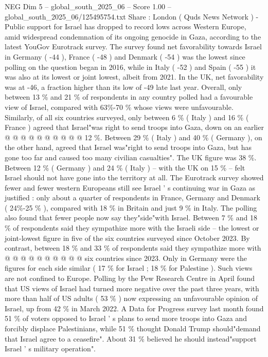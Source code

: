 \begin{textsample}{NEG Dim 5 – global\_south\_2025\_06 – Score 1.00 – global\_south\_2025\_06/125495754.txt}  \label{ex:f5_neg_400}
Share : London ( Quds News Network ) - Public support for Israel has dropped to record lows across Western Europe, amid widespread condemnation of its ongoing genocide in Gaza, according to the latest YouGov Eurotrack survey.
The survey found net favorability towards Israel in Germany ( -44 ), France ( -48 ) and Denmark ( -54 ) was the lowest since polling on the question began in 2016, while in Italy ( -52 ) and Spain ( -55 ) it was also at its lowest or joint lowest, albeit from 2021.
In the UK, net favorability was at -46, a fraction higher than its low of -49 late last year.
Overall, only between 13 \% and 21 \% of respondents in any country polled had a favourable view of Israel, compared with 63\%-70 \% whose views were unfavourable.
Similarly, of all six countries surveyed, only between 6 \% ( Italy ) and 16 \% ( France ) agreed that Israel"was right to send troops into Gaza, down on an earlier @ @ @ @ @ @ @ @ @ @ 12 \%.
Between 29 \% ( Italy ) and 40 \% ( Germany ), on the other hand, agreed that Israel was"right to send troops into Gaza, but has gone too far and caused too many civilian casualties".
The UK figure was 38 \%.
Between 12 \% ( Germany ) and 24 \% ( Italy ) -- with the UK on 15 \% -- felt Israel should not have gone into the territory at all.
The Eurotrack survey showed fewer and fewer western Europeans still see Israel ' s continuing war in Gaza as justified : only about a quarter of respondents in France, Germany and Denmark ( 24\%-25 \% ), compared with 18 \% in Britain and just 9 \% in Italy.
The polling also found that fewer people now say they"side"with Israel.
Between 7 \% and 18 \% of respondents said they sympathize more with the Israeli side -- the lowest or joint-lowest figure in five of the six countries surveyed since October 2023.
By contrast, between 18 \% and 33 \% of respondents said they sympathize more with @ @ @ @ @ @ @ @ @ @ six countries since 2023.
Only in Germany were the figures for each side similar ( 17 \% for Israel ; 18 \% for Palestine ).
Such views are not confined to Europe.
Polling by the Pew Research Centre in April found that US views of Israel had turned more negative over the past three years, with more than half of US adults ( 53 \% ) now expressing an unfavourable opinion of Israel, up from 42 \% in March 2022.
A Data for Progress survey last month found 51 \% of voters opposed to Israel ' s plans to send more troops into Gaza and forcibly displace Palestinians, while 51 \% thought Donald Trump should"demand that Israel agree to a ceasefire".
About 31 \% believed he should instead"support Israel ' s military operation".

\end{textsample}
